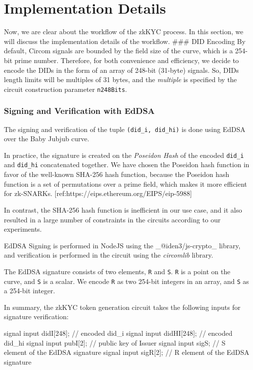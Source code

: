 \documentclass[
]{report}
\newenvironment{Shaded}{}{}
\newcommand{\NormalTok}[1]{#1}
\begin{document}
\section{Implementation Details}

Now, we are clear about the workflow of the zkKYC process. In this
section, we will discuss the implementation details of the workflow.
\#\#\# DID Encoding By default, Circom signals are bounded by the field
size of the curve, which is a 254-bit prime number. Therefore, for both
convenience and efficiency, we decide to encode the DIDs in the form of
an array of 248-bit (31-byte) signals. So, DIDs length limits will be
multiples of 31 bytes, and the \emph{multiple} is specified by the
circuit construction parameter \texttt{n248Bits}.

\subsubsection{Signing and Verification with
EdDSA}

The signing and verification of the tuple \texttt{(did\_i,\ did\_hi)} is
done using EdDSA over the Baby Jubjub curve.

In practice, the signature is created on the \emph{Poseidon Hash} of the
encoded \texttt{did\_i} and \texttt{did\_hi} concatenated together. We
have chosen the Poseidon hash function in favor of the well-known
SHA-256 hash function, because the Poseidon hash function is a set of
permutations over a prime field, which makes it more efficient for
zk-SNARKs.
{[}ref:https://eips.ethereum.org/EIPS/eip-5988{]}

In contrast, the SHA-256 hash function is inefficient in our use case,
and it also resulted in a large number of constraints in the circuits
according to our experiments.

EdDSA Signing is performed in NodeJS using the \_@iden3/js-crypto\_
library, and verification is performed in the circuit using the
\emph{circomlib} library.

The EdDSA signature consists of two elements, \texttt{R} and \texttt{S}.
\texttt{R} is a point on the curve, and \texttt{S} is a scalar. We
encode \texttt{R} as two 254-bit integers in an array, and \texttt{S} as
a 254-bit integer.

In summary, the zkKYC token generation circuit takes the following
inputs for signature verification:

\begin{Shaded}
\begin{Highlighting}[]
\NormalTok{signal input didI[248];  // encoded did\_i}
\NormalTok{signal input didHI[248]; // encoded did\_hi}
\NormalTok{signal input pubI[2];    // public key of Issuer}
\NormalTok{signal input sigS;       // S element of the EdDSA signature}
\NormalTok{signal input sigR[2];    // R element of the EdDSA signature}
\end{Highlighting}
\end{Shaded}
\end{document}
